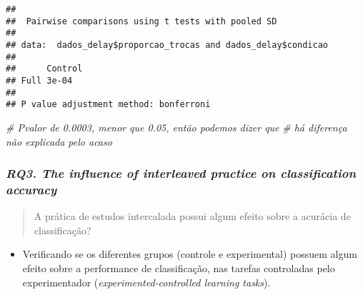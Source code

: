 \documentclass[
]{article}
\newenvironment{Shaded}{\begin{snugshade}}{\end{snugshade}}
\newcommand{\AttributeTok}[1]{\textcolor[rgb]{0.13,0.29,0.53}{#1}}
\newcommand{\CommentTok}[1]{\textcolor[rgb]{0.56,0.35,0.01}{\textit{#1}}}
\newcommand{\ConstantTok}[1]{\textcolor[rgb]{0.56,0.35,0.01}{#1}}
\newcommand{\FunctionTok}[1]{\textcolor[rgb]{0.13,0.29,0.53}{\textbf{#1}}}
\newcommand{\NormalTok}[1]{#1}
\newcommand{\OtherTok}[1]{\textcolor[rgb]{0.56,0.35,0.01}{#1}}
\newcommand{\SpecialCharTok}[1]{\textcolor[rgb]{0.81,0.36,0.00}{\textbf{#1}}}
\providecommand{\tightlist}{%
  \setlength{\itemsep}{0pt}\setlength{\parskip}{0pt}}
\begin{document}
\begin{verbatim}
## 
##  Pairwise comparisons using t tests with pooled SD 
## 
## data:  dados_delay$proporcao_trocas and dados_delay$condicao 
## 
##      Control
## Full 3e-04  
## 
## P value adjustment method: bonferroni
\end{verbatim}

\begin{Shaded}
\begin{Highlighting}[]
\CommentTok{\# Pvalor de 0.0003, menor que 0.05, então podemos dizer que}
\CommentTok{\# há diferença não explicada pelo acaso}
\end{Highlighting}
\end{Shaded}

\subsubsection{\texorpdfstring{\emph{RQ3. The influence of interleaved
practice on classification
accuracy}}{RQ3. The influence of interleaved practice on classification accuracy}}\label{rq3.-the-influence-of-interleaved-practice-on-classification-accuracy}

\begin{quote}
A prática de estudos intercalada possui algum efeito sobre a acurácia de
classificação?
\end{quote}

\begin{itemize}
\tightlist
\item
  Verificando se os diferentes grupos (controle e experimental) possuem
  algum efeito sobre a performance de classificação, nas tarefas
  controladas pelo experimentador (\emph{experimented-controlled
  learning tasks}).
\end{itemize}

\begin{Shaded}
\end{Shaded}
\end{document}
